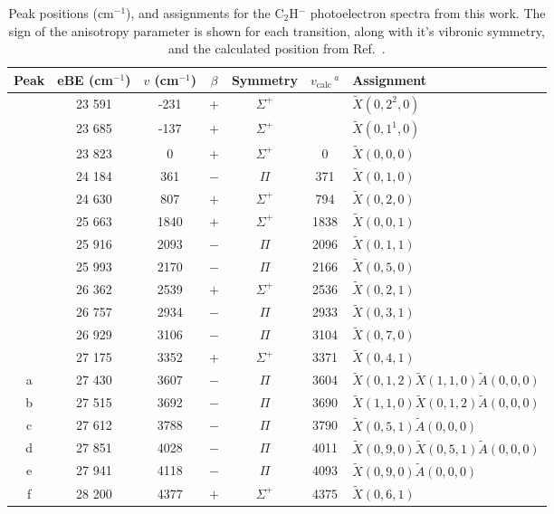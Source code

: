 \documentclass[journal=jacsat,manuscript=suppinfo]{achemso}
\begin{document}
\begin{table}
	\caption{Peak positions (cm$^{-1}$), and assignments for the C$_2$H$^-$ photoelectron spectra from this work. The sign of the anisotropy parameter is shown for each transition, along with it's vibronic symmetry, and the calculated position from Ref.~\cite{tar03}.} \label{tab:1}
	\begin{tabular}{c c c c c c l}
		\hline Peak & eBE (cm$^{-1}$) & $v$ (cm$^{-1}$) & $\beta$ & Symmetry &  $v_{\text{calc}}\,^a$ & {Assignment}  \\ 
		 \hline \hline
		& 23 591 & -231 & + & $\Sigma^+$ & & $\tilde{X}(0,2^2,0)$ \\
		& 23 685 & -137 &  + & $\Sigma^+$ & & $\tilde{X}(0,1^1,0)$ \\
		& 23 823 & 0 & + & $\Sigma^+$ &  0 & $\tilde{X}(0,0,0)$ \\
		& 24 184 & 361 & $-$ & $\Pi$ & 371 & $\tilde{X}(0,1,0)$  \\
		& 24 630 & 807 & $+$ & $\Sigma^+$ & 794 & $\tilde{X}(0,2,0)$ \\
		& 25 663 & 1840 & $+$ & $\Sigma^+$ & 1838 & $\tilde{X}(0,0,1)$  \\
		& 25 916 & 2093 & $-$ & $\Pi$ & 2096 & $\tilde{X}(0,1,1)$  \\
		& 25 993 & 2170 & $-$ & $\Pi$ & 2166 & $\tilde{X}(0,5,0)$  \\
		& 26 362 & 2539 & $+$ & $\Sigma^+$ & 2536 & $\tilde{X}(0,2,1)$  \\
		& 26 757 &  2934 & $-$ & $\Pi$ & 2933 & $\tilde{X}(0,3,1)$  \\
		& 26 929 & 3106 & $-$ & $\Pi$ & 3104 & $\tilde{X}(0,7,0)$  \\
		& 27 175 & 3352 & + & $\Sigma^+$ & 3371 & $\tilde{X}(0,4,1)$ \\
		a & 27 430 & 3607 & $-$ & $\Pi$ & 3604 & $\tilde{X}(0,1,2)\tilde{X}(1,1,0)\tilde{A}(0,0,0)$  \\
		b & 27 515 & 3692 & $-$ & $\Pi$ & 3690 & $\tilde{X}(1,1,0)\tilde{X}(0,1,2)\tilde{A}(0,0,0)$   \\
		c & 27 612 & 3788 & $-$ & $\Pi$ & 3790 & $\tilde{X}(0,5,1)\tilde{A}(0,0,0)$  \\
		d & 27 851 & 4028 & $-$ & $\Pi$ & 4011 & $\tilde{X}(0,9,0)\tilde{X}(0,5,1)\tilde{A}(0,0,0)$  \\
		e & 27 941 & 4118 & $-$ & $\Pi$ & 4093 & $\tilde{X}(0,9,0)\tilde{A}(0,0,0)$  \\
		f & 28 200 & 4377 & $+$ & $\Sigma^+$ & 4375 & $\tilde{X}(0,6,1)$  \\

\end{tabular}
\end{table}
\end{document}
